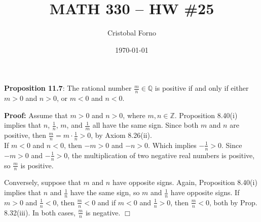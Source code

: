 \documentclass[12pt]{article}
\title{MATH 330 -- HW \#25}
\author{Cristobal Forno}
\date{\today}
\begin{document}
\maketitle

\textbf{Proposition 11.7}: The rational number $\frac{m}{n} \in \mathbb{Q}$ is
positive if and only if either $m > 0$ and $n > 0$, or $m < 0$ and $n < 0$.

\textbf{Proof:} Assume that $m > 0$ and $n > 0$, where $m, n \in \mathbb{Z}$.
Proposition 8.40(i) implies that $n$, $\frac{1}{n}$, $m$, and $\frac{1}{m}$ all
have the same sign. Since both $m$ and $n$ are positive, then $\frac{m}{n} = m \cdot
\frac{1}{n} > 0$, by Axiom 8.26(ii). \\
\indent
If $m < 0$ and $n < 0$, then $-m > 0$ and $-n > 0$. Which implies $-\frac{1}{n}
> 0$. Since  $-m > 0$ and $-\frac{1}{n} > 0$, the multiplication of two negative
real numbers is positive, so $\frac{m}{n}$ is positive.


Conversely, suppose that $m$ and $n$ have opposite signs. Again, Proposition
8.40(i) implies that $n$ and $\frac{1}{n}$ have the same sign, so $m$ and
$\frac{1}{n}$ have opposite signs. If $m > 0$ and $\frac{1}{n} < 0$, then
$\frac{m}{n} < 0$ and if $m < 0$ and $\frac{1}{n} > 0$, then $\frac{m}{n} < 0$,
both by Prop. 8.32(iii). In both cases, $\frac{m}{n}$ is negative. $\Box$
\end{document}
